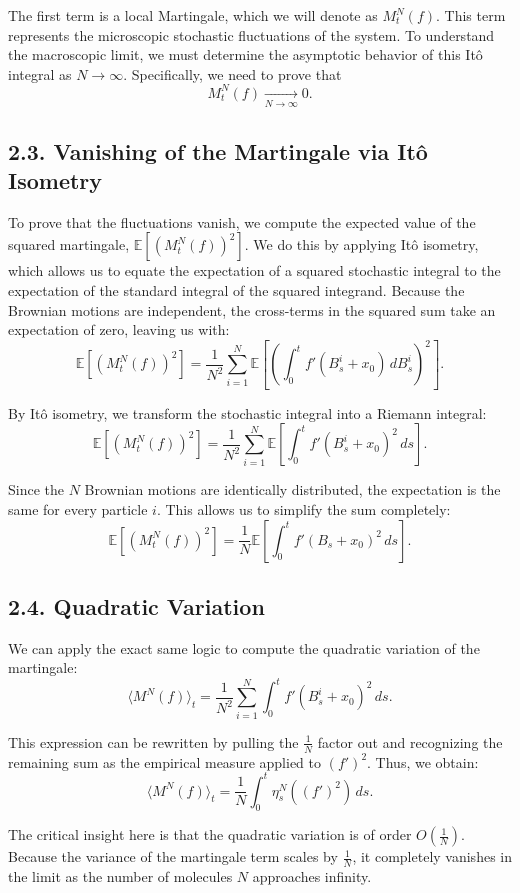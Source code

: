\documentclass[11pt]{article}
\theoremstyle{definition}
\theoremstyle{remark}
\begin{document}
The first term is a local Martingale, which we will denote as $M_t^N(f)$. This term represents the microscopic stochastic fluctuations of the system. To understand the macroscopic limit, we must determine the asymptotic behavior of this It\^o integral as $N\to\infty$. Specifically, we need to prove that
\[
M_t^N(f)\xrightarrow[N\to\infty]{}0.
\]

\subsection*{2.3. Vanishing of the Martingale via It\^o Isometry}
To prove that the fluctuations vanish, we compute the expected value of the squared martingale, $\mathbb E[(M_t^N(f))^2]$. We do this by applying It\^o isometry, which allows us to equate the expectation of a squared stochastic integral to the expectation of the standard integral of the squared integrand. Because the Brownian motions are independent, the cross-terms in the squared sum take an expectation of zero, leaving us with:
\[
\mathbb E[(M_t^N(f))^2]
=
\frac{1}{N^2}\sum_{i=1}^N
\mathbb E\!\left[
\left(\int_0^t f'(B_s^i+x_0)\,dB_s^i\right)^2
\right].
\]

By It\^o isometry, we transform the stochastic integral into a Riemann integral:
\[
\mathbb E[(M_t^N(f))^2]
=
\frac{1}{N^2}\sum_{i=1}^N
\mathbb E\!\left[
\int_0^t f'(B_s^i+x_0)^2\,ds
\right].
\]

Since the $N$ Brownian motions are identically distributed, the expectation is the same for every particle $i$. This allows us to simplify the sum completely:
\[
\mathbb E[(M_t^N(f))^2]
=
\frac{1}{N}
\mathbb E\!\left[
\int_0^t f'(B_s+x_0)^2\,ds
\right].
\]

\subsection*{2.4. Quadratic Variation}
We can apply the exact same logic to compute the quadratic variation of the martingale:
\[
\langle M^N(f)\rangle_t
=
\frac{1}{N^2}\sum_{i=1}^N
\int_0^t f'(B_s^i+x_0)^2\,ds.
\]

This expression can be rewritten by pulling the $\frac{1}{N}$ factor out and recognizing the remaining sum as the empirical measure applied to $(f')^2$. Thus, we obtain:
\[
\langle M^N(f)\rangle_t
=
\frac{1}{N}\int_0^t \eta_s^N((f')^2)\,ds.
\]

The critical insight here is that the quadratic variation is of order $O\!\left(\frac{1}{N}\right)$. Because the variance of the martingale term scales by $\frac{1}{N}$, it completely vanishes in the limit as the number of molecules $N$ approaches infinity.
\end{document}
